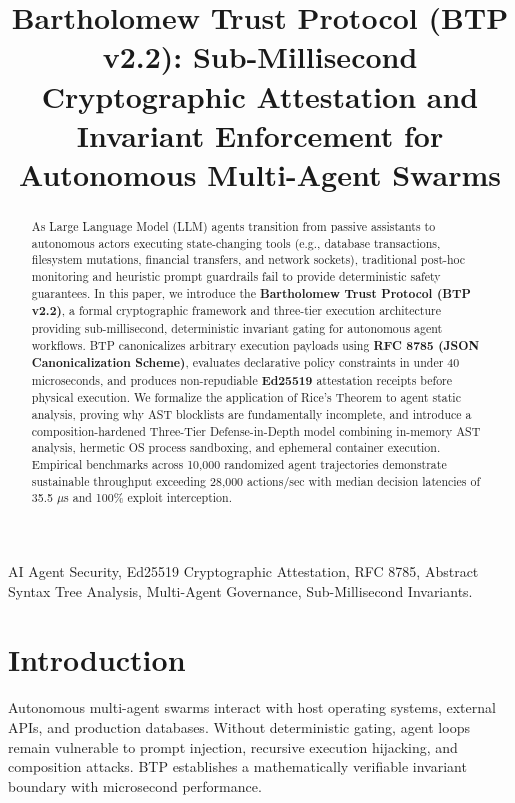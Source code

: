 \documentclass[conference]{IEEEtran}
\begin{document}
\title{Bartholomew Trust Protocol (BTP v2.2): Sub-Millisecond Cryptographic Attestation and Invariant Enforcement for Autonomous Multi-Agent Swarms}

\author{
}

\maketitle

\begin{abstract}
As Large Language Model (LLM) agents transition from passive assistants to autonomous actors executing state-changing tools (e.g., database transactions, filesystem mutations, financial transfers, and network sockets), traditional post-hoc monitoring and heuristic prompt guardrails fail to provide deterministic safety guarantees. In this paper, we introduce the \textbf{Bartholomew Trust Protocol (BTP v2.2)}, a formal cryptographic framework and three-tier execution architecture providing sub-millisecond, deterministic invariant gating for autonomous agent workflows. BTP canonicalizes arbitrary execution payloads using \textbf{RFC 8785 (JSON Canonicalization Scheme)}, evaluates declarative policy constraints in under 40 microseconds, and produces non-repudiable \textbf{Ed25519} attestation receipts before physical execution. We formalize the application of Rice's Theorem to agent static analysis, proving why AST blocklists are fundamentally incomplete, and introduce a composition-hardened Three-Tier Defense-in-Depth model combining in-memory AST analysis, hermetic OS process sandboxing, and ephemeral container execution. Empirical benchmarks across 10,000 randomized agent trajectories demonstrate sustainable throughput exceeding 28,000 actions/sec with median decision latencies of 35.5 $\mu$s and 100\% exploit interception.
\end{abstract}

\begin{IEEEkeywords}
AI Agent Security, Ed25519 Cryptographic Attestation, RFC 8785, Abstract Syntax Tree Analysis, Multi-Agent Governance, Sub-Millisecond Invariants.
\end{IEEEkeywords}

\section{Introduction}
Autonomous multi-agent swarms interact with host operating systems, external APIs, and production databases. Without deterministic gating, agent loops remain vulnerable to prompt injection, recursive execution hijacking, and composition attacks. BTP establishes a mathematically verifiable invariant boundary with microsecond performance.
\end{document}
